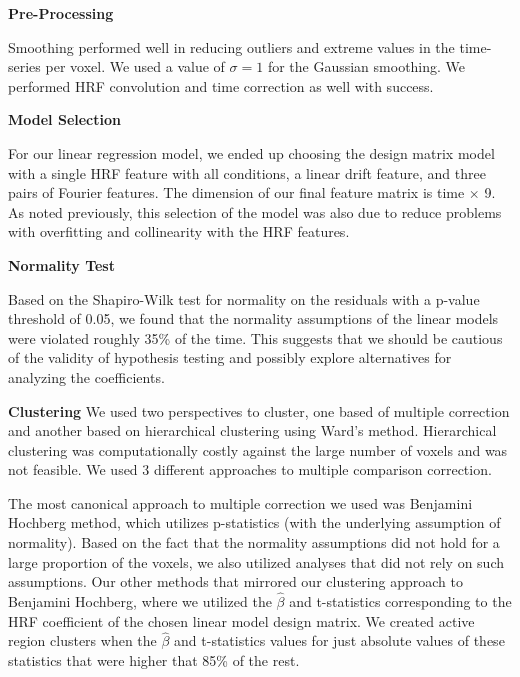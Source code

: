 
\noindent \textbf{Pre-Processing}

Smoothing performed well in reducing outliers and extreme values in the 
time-series per voxel. We used a value of $\sigma=1$ for the Gaussian 
smoothing. We performed HRF convolution and time correction as well with 
success.
\vspace{5mm}

\noindent \textbf{Model Selection}

For our linear regression model, we ended up choosing the design matrix model 
with a single HRF feature with all conditions, a linear drift feature, and 
three pairs of Fourier features. The dimension of our final feature matrix is 
time $\times$ 9. As noted previously, this selection of the model was also 
due to reduce problems with overfitting and collinearity with the HRF features.
\vspace{5mm}

\noindent \textbf{Normality Test}

Based on the Shapiro-Wilk test for normality on the residuals with a p-value 
threshold of 0.05, we found that the normality assumptions of the linear 
models were violated roughly 35\% of the time. This suggests that we should be 
cautious of the validity of hypothesis testing and possibly explore 
alternatives for analyzing the coefficients.
\vspace{5mm}

\noindent \textbf{Clustering}
We used two perspectives to cluster, one based of multiple correction and 
another based on hierarchical clustering using Ward's method. Hierarchical 
clustering was computationally costly against the large number of voxels and 
was not feasible. We used 3 different approaches to multiple comparison 
correction. 

The most canonical approach to multiple correction we used was Benjamini Hochberg
method, which utilizes p-statistics (with the underlying assumption of normality).
Based on the fact that the normality assumptions did not hold for a large 
proportion of the voxels, we also utilized analyses that did not rely on such 
assumptions. Our other methods that mirrored our clustering approach to Benjamini
Hochberg, where we utilized the $\hat{\beta}$ and t-statistics corresponding to the HRF 
coefficient of the chosen linear model design matrix. We created active region 
clusters when the $\hat{\beta}$ and t-statistics values for just absolute values of 
these statistics that were higher that 85\% of the rest.
\vspace{5mm}



